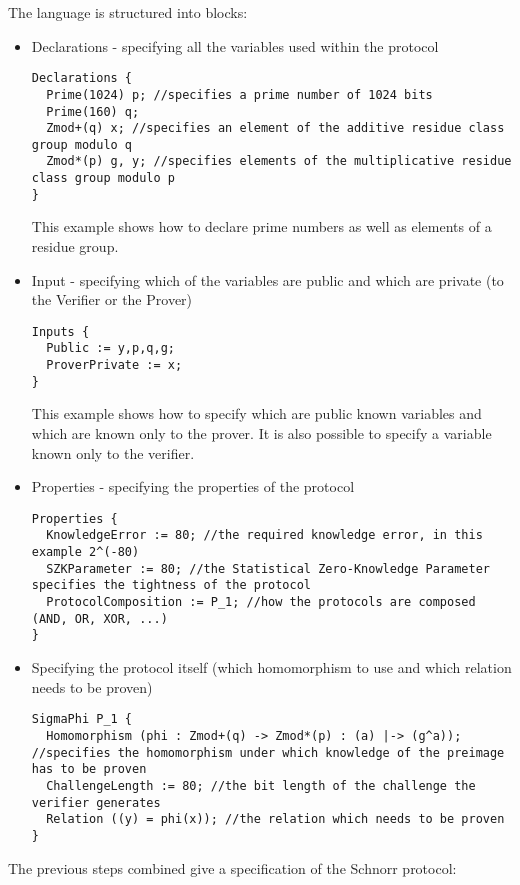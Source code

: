 The language is structured into blocks:
\begin{itemize}
\item Declarations - specifying all the variables used within
  the protocol
\begin{lstlisting}[language=PSL]
Declarations {
  Prime(1024) p; //specifies a prime number of 1024 bits
  Prime(160) q;
  Zmod+(q) x; //specifies an element of the additive residue class group modulo q
  Zmod*(p) g, y; //specifies elements of the multiplicative residue class group modulo p
}
\end{lstlisting}
  This example shows how to declare prime numbers as well as elements
  of a residue group.
\item Input - specifying which of the variables are public and which
  are private (to the Verifier or the Prover)
\begin{lstlisting}[language=PSL]
Inputs {
  Public := y,p,q,g;
  ProverPrivate := x;
}
\end{lstlisting}
  This example shows how to specify which are public known variables
  and which are known only to the prover. It is also possible to
  specify a variable known only to the verifier.
\item Properties - specifying the properties of the protocol
\begin{lstlisting}[language=PSL]
Properties {
  KnowledgeError := 80; //the required knowledge error, in this example 2^(-80)
  SZKParameter := 80; //the Statistical Zero-Knowledge Parameter specifies the tightness of the protocol
  ProtocolComposition := P_1; //how the protocols are composed (AND, OR, XOR, ...)
}
\end{lstlisting}
\item Specifying the protocol itself (which homomorphism to
  use and which relation needs to be proven)
\begin{lstlisting}[language=PSL]
SigmaPhi P_1 {
  Homomorphism (phi : Zmod+(q) -> Zmod*(p) : (a) |-> (g^a)); //specifies the homomorphism under which knowledge of the preimage has to be proven
  ChallengeLength := 80; //the bit length of the challenge the verifier generates
  Relation ((y) = phi(x)); //the relation which needs to be proven
}
\end{lstlisting}
\end{itemize}

The previous steps combined give a specification of the Schnorr
protocol:


\filbreak

